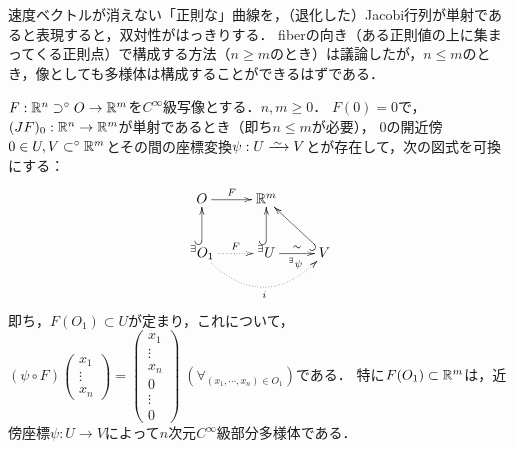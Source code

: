 \documentclass[uplatex,dvipdfmx]{jsreport}
\begin{document}
\begin{tcolorbox}[colframe=ForestGreen, colback=ForestGreen!10!white,breakable,colbacktitle=ForestGreen!40!white,coltitle=black,fonttitle=\bfseries\sffamily,
title=]
    速度ベクトルが消えない「正則な」曲線を，（退化した）Jacobi行列が単射であると表現すると，双対性がはっきりする．
    fiberの向き（ある正則値の上に集まってくる正則点）で構成する方法（$n\ge m$のとき）は議論したが，$n\le m$のとき，像としても多様体は構成することができるはずである．
\end{tcolorbox}

\begin{theorem}[陰関数定理の双対]\label{thm-dual-of-implicit-function-theorem}
    $F:\mathbb{R}^n\supset^\circ O\to\mathbb{R}^m$を$C^\infty$級写像とする．$n,m\ge 0$．
    $F(0)=0$で，$(JF)_0:\mathbb{R}^n\to\mathbb{R}^m$が単射であるとき（即ち$n\le m$が必要），
    $0$の開近傍$0\in U,V\subset^\circ\mathbb{R}^m$とその間の座標変換$\psi:U\iso V$とが存在して，次の図式を可換にする：
    \[\xymatrix{
        O\ar[r]^-F&\R^m\\
        {}^\exists O_1\ar@/_2pc/@{.>}[rr]_-{i}\ar@{^{(}->}[u]\ar@{.>}[r]^-{F}&{}^\exists U\ar@{^{(}->}[u]\ar[r]^-{\sim}_{{}^\exists\psi}&V\ar@{^{(}->}[ul]
    }\]
    即ち，$F(O_1)\subset U$が定まり，これについて，$(\psi\circ F)\begin{pmatrix}x_1\\\vdots\\x_n\end{pmatrix}=\begin{pmatrix}x_1\\\vdots\\x_n\\0\\\vdots\\0\end{pmatrix}\;(\forall_{(x_1,\cdots,x_n)\in O_1})$である．
    特に$F(O_1)\subset\mathbb{R}^m$は，近傍座標$\psi:U\to V$によって$n$次元$C^\infty$級部分多様体である．
\end{theorem}
\end{document}
